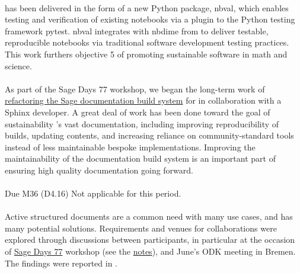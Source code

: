 \documentclass{deliverablereport}
\begin{document}
\paragraph{}

 has been delivered in the form of a new Python package, nbval,
which enables testing and verification of existing notebooks via a plugin to the Python testing
framework pytest. nbval integrates with nbdime from  to deliver
testable, reproducible notebooks via traditional software development testing practices.
This work furthers \ODK objective 5 of promoting sustainable software in math and science.

\paragraph{}
\label{UI@sage-sphinx}

As part of the Sage Days 77 workshop, we began the long-term work of
\href{https://wiki.sagemath.org/days77/documentation}{refactoring the Sage documentation build
system} for  in collaboration with a Sphinx developer. A great deal
of work has been done toward the goal of sustainability \Sage's vast documentation, including
improving reproducibility of builds, updating contents, and increasing reliance on
community-standard tools instead of less maintainable bespoke
implementations. Improving the maintainability of the \Sage
documentation build system is an important part of ensuring high quality documentation going forward.

\paragraph{} Due M36 (D4.16)
Not applicable for this period.

\paragraph{}

Active structured documents are a common need with many use cases, and has many potential solutions.
Requirements and venues for collaborations were explored through discussions between participants,
in particular at the occasion of \href{https://wiki.sagemath.org/days77/}{Sage Days 77} workshop
(see the \href{https://wiki.sagemath.org/days77/live-structured-documents}{notes}), and June's ODK
meeting in Bremen. The findings were reported in .
\end{document}
